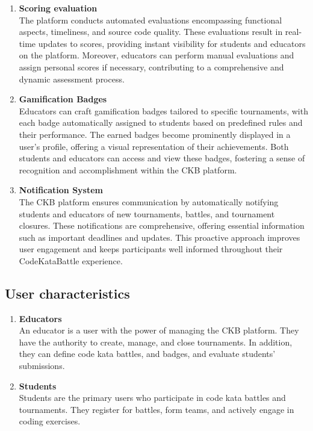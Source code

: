 \begin{enumerate}
    \item \textbf{Scoring evaluation} \\
    The platform conducts automated evaluations encompassing functional aspects, timeliness, and source code quality. These evaluations result in real-time updates to scores, providing instant visibility for students and educators on the platform. Moreover, educators can perform manual evaluations and assign personal scores if necessary, contributing to a comprehensive and dynamic assessment process.
    
    \item \textbf{Gamification Badges} \\
    Educators can craft gamification badges tailored to specific tournaments, with each badge automatically assigned to students based on predefined rules and their performance. The earned badges become prominently displayed in a user's profile, offering a visual representation of their achievements. Both students and educators can access and view these badges, fostering a sense of recognition and accomplishment within the CKB platform.    

    \item \textbf{Notification System} \\
    The CKB platform ensures communication by automatically notifying students and educators of new tournaments, battles, and tournament closures. These notifications are comprehensive, offering essential information such as important deadlines and updates. This proactive approach improves user engagement and keeps participants well informed throughout their CodeKataBattle experience.
    
\end{enumerate}


\subsection{User characteristics}

\begin{enumerate}
    \item \textbf{Educators} \\
    An educator is a user with the power of managing the CKB platform. They have the authority to create, manage, and close tournaments. In addition, they can define code kata battles, and badges, and evaluate students' submissions.

    \item \textbf{Students} \\
     Students are the primary users who participate in code kata battles and tournaments. They register for battles, form teams, and actively engage in coding exercises.
        
\end{enumerate}

